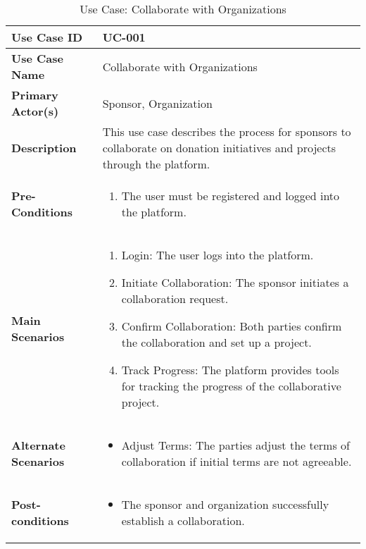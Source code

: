 \begin{table}[!ht]
    \centering
    \renewcommand{\arraystretch}{1.3} %
    \begin{tabularx}{\textwidth}{|l|X|}
        \hline
        \textbf{Use Case ID} & UC-001 \\
        \hline
        \textbf{Use Case Name} & Collaborate with Organizations \\
        \hline
        \textbf{Primary Actor(s)} & Sponsor, Organization \\
        \hline
        \textbf{Description} &  This use case describes the process for sponsors to collaborate on donation initiatives and projects through the platform.\\
        \hline
        \textbf{Pre-Conditions} & 
        \begin{enumerate}[label=\arabic*.,itemsep=0pt]
            \item The user must be registered and logged into the platform.
        \end{enumerate} \\
        \hline
        \textbf{Main Scenarios} & 
        \begin{enumerate}[label=\arabic*.,itemsep=0pt]
            \item Login: The user logs into the platform.
            \item Initiate Collaboration: The sponsor initiates a collaboration request.
            \item Confirm Collaboration: Both parties confirm the collaboration and set up a project.
            \item Track Progress: The platform provides tools for tracking the progress of the collaborative project.
        \end{enumerate} \\
        
        \hline
        \textbf{Alternate Scenarios} & 
        \begin{itemize}[label=--,itemsep=0pt]
            \item Adjust Terms: The parties adjust the terms of collaboration if initial terms are not agreeable.
        \end{itemize} \\
        \hline
        \textbf{Post-conditions} & 
        \begin{itemize}[label=--,itemsep=0pt]
            \item The sponsor and organization successfully establish a collaboration.
        \end{itemize} \\
        \hline
    \end{tabularx}
    \caption{Use Case: Collaborate with Organizations}
    \label{tab:use-case-register}
\end{table}

